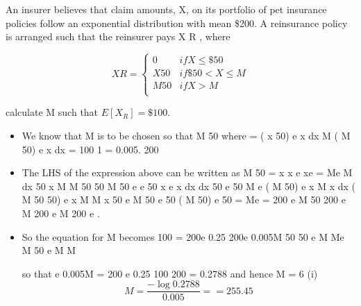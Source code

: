 \documentclass[a4paper,12pt]{article}
\begin{document}

An insurer believes that claim amounts, X, on its portfolio of pet insurance policies follow an exponential distribution with mean \$200.
A reinsurance policy is arranged such that the reinsurer pays X R , where

\[
X R =
\begin{cases}
0 & if X \leq \$50 \\
X 50 & if \$50 <X \leq M\\ 
M 50 & if X> M\\
\end{cases}
\]


calculate M such that $E[X_R ] = \$100$.
\newpage
\begin{itemize}
    \item 

We know that M is to be chosen so that
M
50
where
=
( x 50) e
x
dx
M
( M
50) e
x
dx = 100
1
= 0.005.
200
\item The LHS of the expression above can be written as
M
50
=
x
x e
xe
= Me
M
dx 50
x M M
50 50
M
50 e
e
50
x
e
x
dx
dx 50
e
50
M
e
( M
50) e
x M
x
dx
( M
50
50) e
x
M
M
x
50 e
M
50 e
50
( M
50) e
50
= Me
= 200 e
M
50
200 e M
200 e M
200 e
.
\item 
So the equation for M becomes
100 = 200e
0.25
200e
0.005M
50
50 e
M
Me
M
50 e
M
M

so that
e
0.005M
=
200 e
0.25
100
200
= 0.2788
and hence
M =
6
(i)
\[ M = \frac{- \log 0.2788}{0.005} = 
= 255.45\]
\end{itemize}
\end{document}
